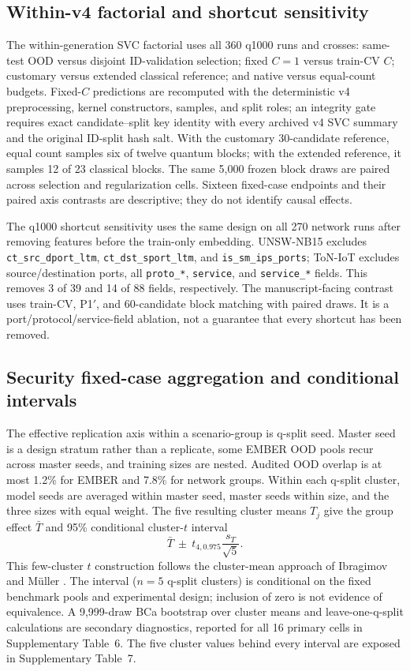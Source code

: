 \documentclass[referee,lineno,pdflatex,sn-nature]{sn-jnl}
\theoremstyle{thmstyleone}%
\theoremstyle{thmstyletwo}%
\theoremstyle{thmstylethree}%
\begin{document}
\subsection{Within-v4 factorial and shortcut sensitivity}

The within-generation SVC factorial uses all 360 q1000 runs and crosses: same-test OOD versus disjoint ID-validation selection; fixed $C=1$ versus train-CV $C$; customary versus extended classical reference; and native versus equal-count budgets. Fixed-$C$ predictions are recomputed with the deterministic v4 preprocessing, kernel constructors, samples, and split roles; an integrity gate requires exact candidate--split key identity with every archived v4 SVC summary and the original ID-split hash salt. With the customary 30-candidate reference, equal count samples six of twelve quantum blocks; with the extended reference, it samples 12 of 23 classical blocks. The same 5,000 frozen block draws are paired across selection and regularization cells. Sixteen fixed-case endpoints and their paired axis contrasts are descriptive; they do not identify causal effects.

The q1000 shortcut sensitivity uses the same design on all 270 network runs after removing features before the train-only embedding. UNSW-NB15 excludes \texttt{ct\_src\_dport\_ltm}, \texttt{ct\_dst\_sport\_ltm}, and \texttt{is\_sm\_ips\_ports}; ToN-IoT excludes source/destination ports, all \texttt{proto\_*}, \texttt{service}, and \texttt{service\_*} fields. This removes 3 of 39 and 14 of 88 fields, respectively. The manuscript-facing contrast uses train-CV, P1$'$, and 60-candidate block matching with paired draws. It is a port/protocol/service-field ablation, not a guarantee that every shortcut has been removed.

\subsection{Security fixed-case aggregation and conditional intervals}

The effective replication axis within a scenario-group is q-split seed. Master seed is a design stratum rather than a replicate, some EMBER OOD pools recur across master seeds, and training sizes are nested. Audited OOD overlap is at most 1.2\% for EMBER and 7.8\% for network groups. Within each q-split cluster, model seeds are averaged within master seed, master seeds within size, and the three sizes with equal weight. The five resulting cluster means $T_j$ give the group effect $\bar T$ and 95\% conditional cluster-$t$ interval
\[
\bar T\ \pm\ t_{4,0.975}\frac{s_T}{\sqrt{5}}.
\]
This few-cluster $t$ construction follows the cluster-mean approach of Ibragimov and M{\"u}ller \cite{ibragimov2016fewclusters}. The interval ($n=5$ q-split clusters) is conditional on the fixed benchmark pools and experimental design; inclusion of zero is not evidence of equivalence. A 9,999-draw BCa bootstrap over cluster means and leave-one-q-split calculations are secondary diagnostics, reported for all 16 primary cells in Supplementary Table~6. The five cluster values behind every interval are exposed in Supplementary Table~7.
\end{document}

